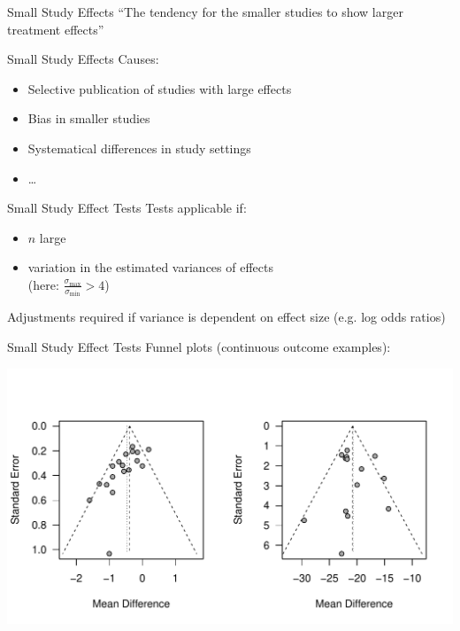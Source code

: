\documentclass[english]{beamer}\usepackage[]{graphicx}\usepackage[]{color}
\makeatletter
\def\maxwidth{ %
  \ifdim\Gin@nat@width>\linewidth
    \linewidth
  \else
    \Gin@nat@width
  \fi
}
\newenvironment{knitrout}{}{} %
\makeatother
\begin{document}
\begin{frame}{Small Study Effects}
``The tendency for the smaller studies to show larger treatment effects'' \citep{Sterne}
\end{frame}


\begin{frame}{Small Study Effects}
Causes:
\begin{itemize}
\item Selective publication of studies with large effects
\item Bias in smaller studies
\item Systematical differences in study settings
\item \ldots
\end{itemize}
\end{frame}


\begin{frame}{Small Study Effect Tests}
Tests applicable if:
\begin{itemize}
\item $n$ large
\item variation in the estimated variances of effects \\(here: $\frac{\sigma_{\textrm{max}}}{\sigma_{\textrm{min}}} > 4$)
\end{itemize}
Adjustments required if variance is dependent on effect size (e.g. log odds ratios)
\end{frame}


\begin{frame}[fragile]{Small Study Effect Tests}
Funnel plots (continuous outcome examples):

\vspace{-1.2cm}

\begin{knitrout}
\color{fgcolor}
\includegraphics[width=\maxwidth]{figure/unnamed-chunk-6-1} 

\end{knitrout}

\end{frame}
\end{document}
